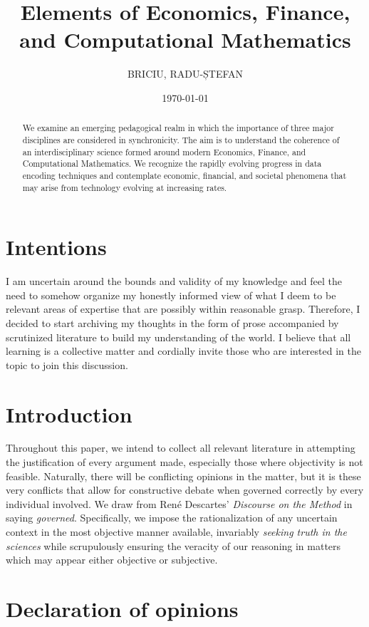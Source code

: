 \documentclass[11pt]{article}
\title{Elements of Economics, Finance, and Computational Mathematics}
\date{\today}
\author{BRICIU, RADU-ȘTEFAN}
\begin{document}
\nocite{*}
\maketitle
\newpage
\begin{abstract}
	\noindent
	We examine an emerging pedagogical realm in which the importance of three major disciplines are considered in synchronicity. The aim is to understand the coherence of an interdisciplinary science formed around modern Economics, Finance, and Computational Mathematics. We recognize the rapidly evolving progress in data encoding techniques and contemplate economic, financial, and societal phenomena that may arise from technology evolving at increasing rates.
\end{abstract}
\newpage
\tableofcontents	
\newpage

\section{Intentions}
I am uncertain around the bounds and validity of my knowledge and feel the need to somehow organize my honestly informed view of what I deem to be relevant areas of expertise that are possibly within reasonable grasp. Therefore, I decided to start archiving my thoughts in the form of prose accompanied by scrutinized literature to build my understanding of the world. I believe that all learning is a collective matter and cordially invite those who are interested in the topic to join this discussion.
\newpage

\section{Introduction}
Throughout this paper, we intend to collect all relevant literature in attempting the justification of every argument made, especially those where objectivity is not feasible. Naturally, there will be conflicting opinions in the matter, but it is these very conflicts that allow for constructive debate when governed correctly by every individual involved. We draw from René Descartes' \textit{Discourse on the Method} \cite{renedescartes_2008_a} in saying \textit{governed}. Specifically, we impose the rationalization of any uncertain context in the most objective manner available, invariably \textit{seeking truth in the sciences} while scrupulously ensuring the veracity of our reasoning in matters which may appear either objective or subjective.

\section{Declaration of opinions}
\end{document}
